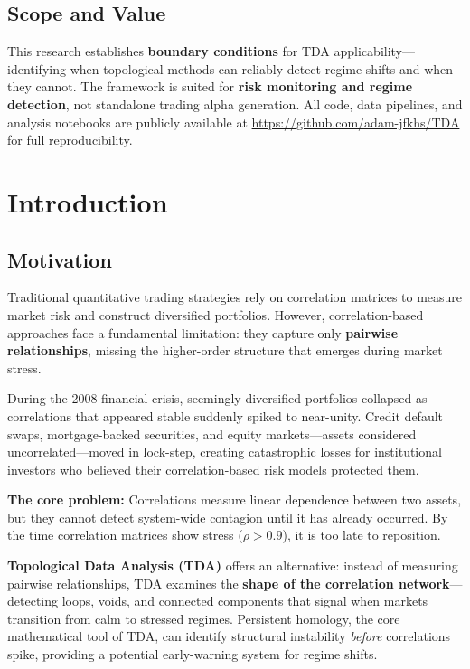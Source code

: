 \documentclass[12pt,letterpaper]{article}
\begin{document}
\subsection*{Scope and Value}

This research establishes \textbf{boundary conditions} for TDA applicability---identifying when topological methods can reliably detect regime shifts and when they cannot. The framework is suited for \textbf{risk monitoring and regime detection}, not standalone trading alpha generation. All code, data pipelines, and analysis notebooks are publicly available at \url{https://github.com/adam-jfkhs/TDA} for full reproducibility.

\clearpage


\section{Introduction}
\label{sec:intro}

\subsection{Motivation}

Traditional quantitative trading strategies rely on correlation matrices to measure market risk and construct diversified portfolios. However, correlation-based approaches face a fundamental limitation: they capture only \textbf{pairwise relationships}, missing the higher-order structure that emerges during market stress.

During the 2008 financial crisis, seemingly diversified portfolios collapsed as correlations that appeared stable suddenly spiked to near-unity. Credit default swaps, mortgage-backed securities, and equity markets---assets considered uncorrelated---moved in lock-step, creating catastrophic losses for institutional investors who believed their correlation-based risk models protected them.

\textbf{The core problem:} Correlations measure linear dependence between two assets, but they cannot detect system-wide contagion until it has already occurred. By the time correlation matrices show stress ($\rho > 0.9$), it is too late to reposition.

\textbf{Topological Data Analysis (TDA)} offers an alternative: instead of measuring pairwise relationships, TDA examines the \textbf{shape of the correlation network}—detecting loops, voids, and connected components that signal when markets transition from calm to stressed regimes. Persistent homology, the core mathematical tool of TDA, can identify structural instability \textit{before} correlations spike, providing a potential early-warning system for regime shifts.
\end{document}
